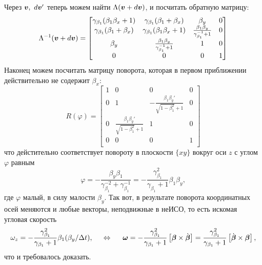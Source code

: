 Через $\mbox{\boldmath $v$}, \ d \mbox{\boldmath $v$}'$ теперь можем найти $\Lambda(\mbox{\boldmath $v$} + d \mbox{\boldmath $v$})$, и посчитать обратную матрицу:
\begin{equation*}
    \Lambda^{-1} (\mbox{\boldmath $v$} + d \mbox{\boldmath $v$}) = 
    \begin{bmatrix}
         \gamma_{\beta_1} (\beta_1 \beta_x+1) & \gamma_{\beta_1} (\beta_1+\beta_x) & \beta_y & 0 \\
         \gamma_{\beta_1} (\beta_1+\beta_x) & \gamma_{\beta_1} (\beta_1 \beta_x+1) & \frac{\beta_1 \beta_y}{\gamma_{\beta_1}^{-1}+1} & 0 \\
         \beta_y & \frac{\beta_1 \beta_y}{\gamma_{\beta_1}^{-1}+1} & 1 & 0 \\
         0 & 0 & 0 & 1 \\
    \end{bmatrix}
\end{equation*}
Наконец можем посчитать матрицу поворота, которая в первом приближении действительно не содержит $\beta_x$:
\begin{equation*}
    R(\varphi) = \begin{bmatrix}
 1 & 0 & 0 & 0 \\
 0 & 1 & -\frac{\beta_1 \beta_y'}{\sqrt{1-\beta_1^2}+1} & 0 \\
 0 & \frac{\beta_1 \beta_y'}{\sqrt{1-\beta_1^2}+1} & 1 & 0 \\
 0 & 0 & 0 & 1 \\
\end{bmatrix}
\end{equation*}
что дейстительно соответствует повороту в плоскости $\{xy\}$ вокруг оси $z$ с углом $\varphi$ равным
\begin{equation*}
    \varphi = -\frac{\beta_y \beta_1}{\gamma_{\beta_1}^{-2} + \gamma_{\beta_1}^{-1}} = 
    -\frac{\gamma_{\beta_1}^{2}}{\gamma_{\beta_1} + 1} \beta_1 \beta_y,
\end{equation*}
где $\varphi$ малый, в силу малости $\beta_y$. Так вот, в результате поворота координатных осей меняются и любые векторы, неподвижные в неИСО, то есть искомая угловая скорость
\begin{equation*}
    \omega_z = -\frac{\gamma_{\beta_1}^{2}}{\gamma_{\beta_1} + 1} \beta_1 (\beta_y / \Delta t),
    \hspace{5 mm}
    \Leftrightarrow
    \hspace{5 mm}
    \mbox{\boldmath $\omega$} = -\frac{\gamma_{\beta_1}^{2}}{\gamma_{\beta_1} + 1} \left[
        \mbox{\boldmath $\beta$} \times  \dot{\mbox{\boldmath $\beta$}}
    \right] = \frac{\gamma_{\beta_1}^{2}}{\gamma_{\beta_1} + 1} \left[
        \dot{\mbox{\boldmath $\beta$}} \times  \mbox{\boldmath $\beta$}
    \right],
\end{equation*}
что и требовалось доказать.
